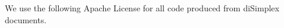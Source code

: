 \stopMkIVCode

We use the following Apache License for all code produced from diSimplex 
documents.

\startMkIVCode
\def\placeMkIVCopyright#1{\addApacheLicense{MkIVCode}{}{#1}}

\def\placeLuaCopyright#1{\addApacheLicense{LuaCode}{--}{#1}}

\def\placeCHeaderCopyright#1{\addApacheLicense{CHeader}{//}{#1}}
\def\placeCCodeCopyright#1{\addApacheLicense{CCode}{//}{#1}}

\def\placeJoylolCopyright#1{\addApacheLicense{JoylolCode}{//}{#1}}
\stopMkIVCode

